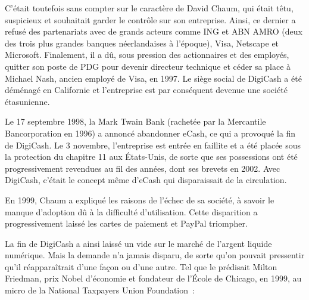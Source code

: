 C'était toutefois sans compter sur le caractère de David Chaum, qui était têtu, suspicieux et souhaitait garder le contrôle sur son entreprise. Ainsi, ce dernier a refusé des partenariats avec de grands acteurs comme ING et ABN AMRO (deux des trois plus grandes banques néerlandaises à l'époque), Visa, Netscape et Microsoft. Finalement, il a dû, sous pression des actionnaires et des employés, quitter son poste de PDG pour devenir directeur technique et céder sa place à Michael Nash, ancien employé de Visa, en 1997. Le siège social de DigiCash a été déménagé en Californie et l'entreprise est par conséquent devenue une société étasunienne.

Le 17 septembre 1998, la Mark Twain Bank (rachetée par la Mercantile Bancorporation en 1996) a annoncé abandonner eCash, ce qui a provoqué la fin de DigiCash. Le 3 novembre, l'entreprise est entrée en faillite et a été placée sous la protection du chapitre 11 aux États-Unis, de sorte que ses possessions ont été progressivement revendues au fil des années, dont ses brevets en 2002. Avec DigiCash, c'était le concept même d'eCash qui disparaissait de la circulation.

En 1999, Chaum a expliqué les raisons de l'échec de sa société, à savoir le manque d'adoption dû à la difficulté d'utilisation. Cette disparition a progressivement laissé les cartes de paiement et PayPal triompher. %

La fin de DigiCash a ainsi laissé un vide sur le marché de l'argent liquide numérique. Mais la demande n'a jamais disparu, de sorte qu'on pouvait pressentir qu'il réapparaîtrait d'une façon ou d'une autre. Tel que le prédisait Milton Friedman, prix Nobel d'économie et fondateur de l'École de Chicago, en 1999, au micro de la National Taxpayers Union Foundation~:

